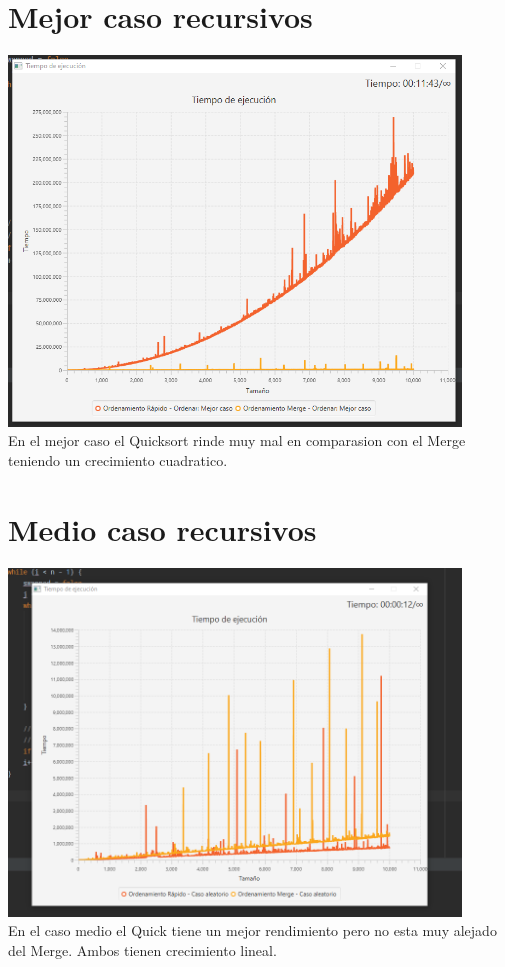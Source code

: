 \documentclass{article}
\begin{document}
\section{Mejor caso recursivos}
\includegraphics[width=12cm]{mejor_r.png}\\
En el mejor caso el Quicksort rinde muy mal en comparasion con el Merge teniendo un crecimiento cuadratico.
\maketitle
\section{Medio caso recursivos}
\includegraphics[width=12cm]{medio_r.png}\\
En el caso medio el Quick tiene un mejor rendimiento pero no esta muy alejado del Merge. Ambos tienen crecimiento lineal.
\maketitle
\end{document}
